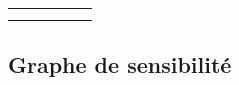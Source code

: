 \documentclass[
]{article}
\begin{document}
\begin{longtable}[t]{lrrrr>{}r}
\cellcolor[HTML]{FADBD8}{\cellcolor{gray!10}{Sédhiou}} & \cellcolor[HTML]{FADBD8}{\cellcolor{gray!10}{0.161}} & \cellcolor[HTML]{FADBD8}{\cellcolor{gray!10}{13}} & \cellcolor[HTML]{FADBD8}{\cellcolor{gray!10}{13}} & \cellcolor[HTML]{FADBD8}{\cellcolor{gray!10}{13}} & \textbf{\cellcolor[HTML]{FADBD8}{\cellcolor{gray!10}{0}}}\\
\cellcolor[HTML]{FADBD8}{Kédougou} & \cellcolor[HTML]{FADBD8}{0.129} & \cellcolor[HTML]{FADBD8}{14} & \cellcolor[HTML]{FADBD8}{14} & \cellcolor[HTML]{FADBD8}{14} & \textbf{\cellcolor[HTML]{FADBD8}{0}}\\
\bottomrule
\end{longtable}
\endgroup{}

\subsection{Graphe de sensibilité}\label{graphe-de-sensibilituxe9}
\end{document}

